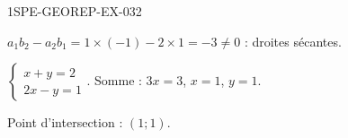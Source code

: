 \begin{corrige}{1SPE-GEOREP-EX-032}

$a_1 b_2 - a_2 b_1 = 1 \times (-1) - 2 \times 1 = -3
\neq 0$ : droites sécantes.

$\begin{cases} x + y = 2 \\ 2x - y = 1 \end{cases}$. Somme : $3x = 3$, $x = 1$, $y = 1$.

Point d'intersection : $\boxed{(1 ; 1)}$.

\end{corrige}
